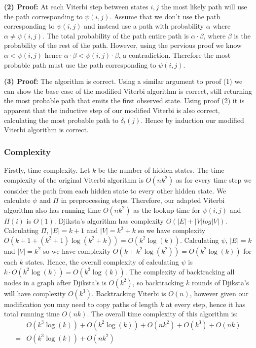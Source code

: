 \textbf{(2) Proof:} At each Viterbi step between states $i,j$ the most likely path will use the path corresponding to $\psi(i,j)$. 
Assume that we don't use the path corresponding to $\psi(i,j)$ and instead use a path with probability $\alpha$ where $\alpha \neq \psi(i,j)$.
The total probability of the path entire path is $\alpha \cdot \beta$, where $\beta$ is the probability of the rest of the path.
However, using the pervious proof we know $\alpha < \psi(i,j)$ hence $\alpha \cdot \beta < \psi(i,j) \cdot \beta$, a contradiction. Therefore the most probable path must use the path corresponding to $\psi(i,j)$. 

\textbf{(3) Proof:} The algorithm is correct. Using a similar argument to proof (1) we can show the base case of the modified Viterbi algorithm is correct, still returning the most probable path that emits the first observed state. Using proof (2) it is apparent that the inductive step of our modified Viterbi is also correct, calculating the most probable path to $\delta_t(j)$. Hence by induction our modified Viterbi algorithm is correct.  



\subsubsection*{Complexity}
Firstly, time complexity. Let $k$ be the number of hidden states. The time complexity of the original Viterbi algorithm is $O(nk^2)$ as for every time step we consider the path from each hidden state to every other hidden state. We calculate $\psi$ and $\Pi$ in preprocessing steps. Therefore, our adapted Viterbi algorithm also has running time $O(nk^2)$ as the lookup time for $\psi(i,j)$ and $\Pi(i)$ is $O(1)$. Djiksta's algorithm has complexity $O(|E|+|V|log|V|)$. Calculating $\Pi$, $|E| = k+1$ and $|V| = k^2 + k$ so we have complexity $O(k+1 + (k^2+1) \log(k^2+k)) = O(k^2 \log(k))$. Calculating $\psi$, $|E| = k$ and $|V| = k^2$ so we have complexity $O(k + k^2 \log(k^2)) = O(k^2 \log(k))$ for each $k$ states. Hence, the overall complexity of calculating $\psi$ is $k\cdot O(k^2 \log(k)) = O(k^3 \log(k))$. The complexity of backtracking all nodes in a graph after Djiksta's is $O(k^2)$, so backtracking $k$ rounds of Djiksta's will have complexity $O(k^3)$. Backtracking Viterbi is $O(n)$, however given our modification you may need to copy paths of length $k$ at every step, hence it has total running time $O(nk)$. The overall time complexity of this algorithm is:
\begin{align*}
&O(k^3 \log(k)) + O(k^2 \log(k)) + O(nk^2) + O(k^3) + O(nk)\\
=& O(k^3 \log(k)) + O(nk^2)
\end{align*}

